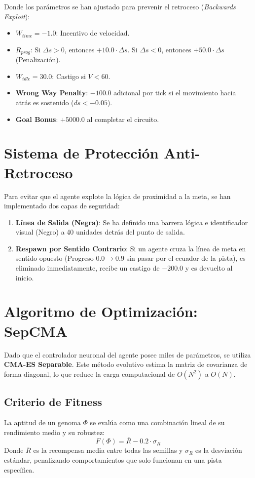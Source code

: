 \documentclass[12pt]{article}
\begin{document}
Donde los parámetros se han ajustado para prevenir el retroceso (\textit{Backwards Exploit}):
\begin{itemize}
    \item $W_{time} = -1.0$: Incentivo de velocidad.
    \item $R_{prog}$: Si $\Delta s > 0$, entonces $+10.0 \cdot \Delta s$. Si $\Delta s < 0$, entonces $+50.0 \cdot \Delta s$ (Penalización).
    \item $W_{idle} = 30.0$: Castigo si $V < 60$.
    \item \textbf{Wrong Way Penalty}: $-100.0$ adicional por tick si el movimiento hacia atrás es sostenido ($ds < -0.05$).
    \item \textbf{Goal Bonus}: $+5000.0$ al completar el circuito.
\end{itemize}

\section{Sistema de Protección Anti-Retroceso}
Para evitar que el agente explote la lógica de proximidad a la meta, se han implementado dos capas de seguridad:
\begin{enumerate}
    \item \textbf{Línea de Salida (Negra)}: Se ha definido una barrera lógica e identificador visual (Negro) a 40 unidades detrás del punto de salida.
    \item \textbf{Respawn por Sentido Contrario}: Si un agente cruza la línea de meta en sentido opuesto (Progreso $0.0 \to 0.9$ sin pasar por el ecuador de la pista), es eliminado inmediatamente, recibe un castigo de $-200.0$ y es devuelto al inicio.
\end{enumerate}

\section{Algoritmo de Optimización: SepCMA}
Dado que el controlador neuronal del agente posee miles de parámetros, se utiliza \textbf{CMA-ES Separable}. Este método evolutivo estima la matriz de covarianza de forma diagonal, lo que reduce la carga computacional de $O(N^2)$ a $O(N)$.

\subsection{Criterio de Fitness}
La aptitud de un genoma $\Phi$ se evalúa como una combinación lineal de su rendimiento medio y su robustez:
\[ F(\Phi) = \bar{R} - 0.2 \cdot \sigma_R \]
Donde $\bar{R}$ es la recompensa media entre todas las semillas y $\sigma_R$ es la desviación estándar, penalizando comportamientos que solo funcionan en una pista específica.
\end{document}
